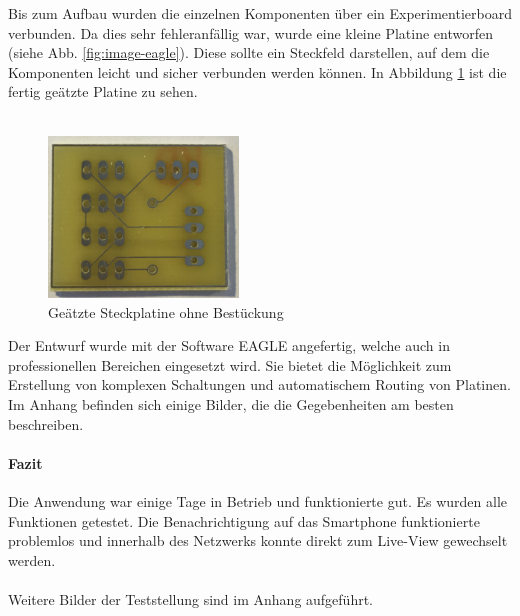 Bis zum Aufbau wurden die einzelnen Komponenten über ein Experimentierboard verbunden. Da dies sehr fehleranfällig war, wurde eine kleine Platine entworfen (siehe Abb. \ref{fig:image-eagle}). Diese sollte ein Steckfeld darstellen, auf dem die Komponenten leicht und sicher verbunden werden können. In Abbildung \ref{fig:image-board} ist die fertig geätzte Platine zu sehen.\\\\
\begin{figure}
	\vspace{-20pt}
	\begin{center}
		\includegraphics[width=0.45\textwidth]{./data/board.png}
	\end{center}
	\vspace{-20pt}
	\caption{\label{fig:image-board}Geätzte Steckplatine ohne Bestückung}
	\vspace{-10pt}
\end{figure} 
Der Entwurf wurde mit der Software \mbox{EAGLE} angefertig, welche auch in professionellen Bereichen eingesetzt wird. Sie bietet die Möglichkeit zum Erstellung von komplexen Schaltungen und automatischem Routing von Platinen. Im Anhang befinden sich einige Bilder, die die Gegebenheiten am besten beschreiben.
\paragraph{Fazit} Die Anwendung war einige Tage in Betrieb und funktionierte gut. Es wurden alle Funktionen getestet. Die Benachrichtigung auf das Smartphone funktionierte problemlos und innerhalb des Netzwerks konnte direkt zum Live-View gewechselt werden. \\\\
Weitere Bilder der Teststellung sind im Anhang aufgeführt.